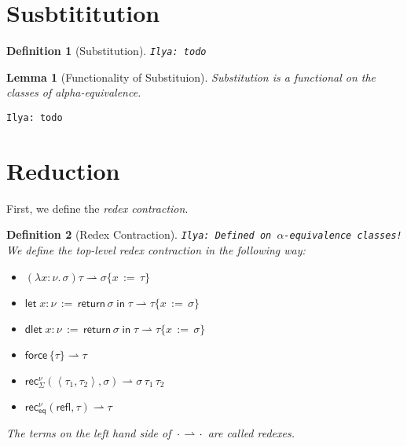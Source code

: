 \documentclass[a4,natbib=false]{article}
\newtheorem{lemma}{Lemma}
\newtheorem{definition}{Definition}
\newcommand{\ilyam}[1]{{\color{red} \texttt{Ilya:  #1}}}
\newcommand{\fun}[2]{\lambda {#1}.\,{#2}}
\newcommand{\letname}{\mathsf{let}}
\newcommand{\dletname}{\mathsf{dlet}}
\newcommand{\letval}[3]{\letname\; {#1} \,:=\, {#2} \;\mathsf{in}\; {#3}}
\newcommand{\dletval}[3]{\dletname\; {#1} \,:=\, {#2} \;\mathsf{in}\; {#3}}
\newcommand{\pair}[2]{\left\langle{#1}, {#2}\right\rangle}
\newcommand{\refl}{\mathsf{refl}}
\newcommand{\force}[1]{\mathsf{force}\,{#1}}
\newcommand{\return}[1]{\mathsf{return}\,{#1}}
\newcommand{\thunk}[1]{\{{#1}\}}
\newcommand{\recsigmaname}{\mathsf{rec}_{\Sigma}}
\newcommand{\recsigma}[3]{\recsigmaname^{#2}({#1},{#3})}
\newcommand{\receqname}{\mathsf{rec}_{\mathsf{eq}}}
\newcommand{\receq}[3]{\receqname^{#2}({#1},{#3})}
\newcommand{\subst}[3]{{#1}\{{#2}\,:=\,{#3}\}}
\newcommand{\spcdot}{\mkern 2mu\cdot\mkern 2mu}
\newcommand{\contracts}[2]{{#1} \rightharpoonup {#2}}
\begin{document}
\section{Susbtititution}
\begin{definition}[Substitution]
  \ilyam{todo}
\end{definition}

\begin{lemma}[Functionality of Substituion]
  Substitution is a functional on the classes of alpha-equivalence.
\end{lemma}
\ilyam{todo}

\section{Reduction}

First, we define the \emph{redex contraction}.
\begin{definition}[Redex Contraction]
  \label{def:redex-contr}
  \ilyam{Defined on $\alpha$-equivalence classes!}
  We define the top-level redex contraction in the following way:
  \begin{multicols}{2}
    \begin{itemize}

    \item $\contracts{(\fun{x:\nu}{\sigma})\tau}{\subst{\sigma}{x}{\tau}}$
      
    \item $\contracts{\letval{x:\nu}{\return{\sigma}}{\tau}}{\subst{\tau}{x}{\sigma}}$

    \item $\contracts{\dletval{x:\nu}{\return{\sigma}}{\tau}}{\subst{\tau}{x}{\sigma}}$

    \item $\contracts{\force{\thunk{\tau}}}{\tau}$

    \item $\contracts{\recsigma{\pair{\tau_1}{\tau_2}}{\nu}{\sigma}}{\sigma \,
        \tau_1 \, \tau_2}$

    \item $\contracts{\receq{\refl}{\nu}{\tau}}{\tau}$

    \end{itemize}
  \end{multicols}

  The terms on the left hand side of $\contracts{\spcdot}{\spcdot}$ are called \emph{redexes}.
  
\end{definition}
\end{document}
